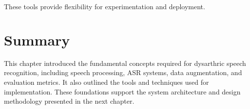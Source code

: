These tools provide flexibility for experimentation and deployment.

\section{Summary}

This chapter introduced the fundamental concepts required for dysarthric speech recognition, including speech processing, ASR systems, data augmentation, and evaluation metrics. It also outlined the tools and techniques used for implementation. These foundations support the system architecture and design methodology presented in the next chapter.